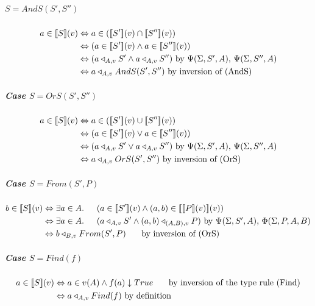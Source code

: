 \documentclass[12pt,a4paper,twoside,openright]{report}
\newcommand{\db}[1]{{\bf [\![}#1{\bf ]\!]}}
\newcommand{\deno}[1]{\db{#1}(v)}
\newcommand{\denoRule}[2]{#1 \in \deno{#2}}
\newcommand{\opRule}[3]{#1 \triangleleft_{#2, v} #3}
\newcommand{\phiRule}[3]{\Phi(\Sigma, #1, #2, #3)}
\newcommand{\psiRule}[2]{\Psi(\Sigma, #1, #2)}
\begin{document}
\subparagraph{$S = AndS(S', S'')$}
\begin{equation} \label{case AndS}
\begin{split}
\denoRule{a}{S} & \Leftrightarrow a \in (\deno{S'} \cap \deno{S''}) \\
				& \Leftrightarrow (\denoRule{a}{S'} \wedge \denoRule{a}{S''}) \\
				& \Leftrightarrow (\opRule{a}{A}{S'} \wedge \opRule{a}{A}{S''}) \mbox{ by $\psiRule{S'}{A}$, $\psiRule{S''}{A}$}\\
				& \Leftrightarrow \opRule{a}{A}{AndS(S', S'')} \mbox{ by inversion of (AndS)}
\end{split}
\end{equation}

\subparagraph{Case $S = OrS(S', S'')$}
\begin{equation} \label{case OrS}
\begin{split}
\denoRule{a}{S} & \Leftrightarrow a \in (\deno{S'} \cup \deno{S''}) \\
				& \Leftrightarrow (\denoRule{a}{S'} \vee \denoRule{a}{S''}) \\
				& \Leftrightarrow (\opRule{a}{A}{S'} \vee \opRule{a}{A}{S''}) \mbox{ by $\psiRule{S'}{A}$, $\psiRule{S''}{A}$}\\
				& \Leftrightarrow \opRule{a}{A}{OrS(S', S'')} \mbox{ by inversion of (OrS)}
\end{split}
\end{equation}

\subparagraph{Case $S = From(S', P)$}
\begin{equation} \label{case From}
\begin{split}
\denoRule{b}{S} & \Leftrightarrow \exists a \in A. \indent (\denoRule{a}{S'} \wedge \denoRule{(a, b)}{\deno{P}}) \\
				& \Leftrightarrow \exists a \in A. \indent (\opRule{a}{A}{S'} \wedge \opRule{(a, b)}{(A, B)}{P}) \mbox{ by $\psiRule{S'}{A}$, $\phiRule{P}{A}{B}$}\\
				& \Leftrightarrow \opRule{b}{B}{From(S', P)} \indent\mbox{ by inversion of (OrS)}
\end{split}
\end{equation}

\subparagraph{Case $S = Find(f)$}
\begin{equation} \label{case Find}
\begin{split}
\denoRule{a}{S} & \Leftrightarrow a \in v(A) \wedge f(a) \downarrow True  \indent \mbox{ by inversion of the type rule (Find)}\\
				& \Leftrightarrow \opRule{a}{A}{Find(f)} \mbox{ by definition}\\
\end{split}
\end{equation}
\end{document}
